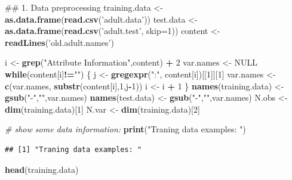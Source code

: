 \documentclass[]{article}
\newenvironment{Shaded}{\begin{snugshade}}{\end{snugshade}}
\newcommand{\KeywordTok}[1]{\textcolor[rgb]{0.13,0.29,0.53}{\textbf{#1}}}
\newcommand{\DataTypeTok}[1]{\textcolor[rgb]{0.13,0.29,0.53}{#1}}
\newcommand{\DecValTok}[1]{\textcolor[rgb]{0.00,0.00,0.81}{#1}}
\newcommand{\StringTok}[1]{\textcolor[rgb]{0.31,0.60,0.02}{#1}}
\newcommand{\CommentTok}[1]{\textcolor[rgb]{0.56,0.35,0.01}{\textit{#1}}}
\newcommand{\OtherTok}[1]{\textcolor[rgb]{0.56,0.35,0.01}{#1}}
\newcommand{\ControlFlowTok}[1]{\textcolor[rgb]{0.13,0.29,0.53}{\textbf{#1}}}
\newcommand{\OperatorTok}[1]{\textcolor[rgb]{0.81,0.36,0.00}{\textbf{#1}}}
\newcommand{\NormalTok}[1]{#1}
\begin{document}
\begin{Shaded}
\begin{Highlighting}[]
\NormalTok{## 1. Data preprocessing}
\NormalTok{training.data <-}\StringTok{ }\KeywordTok{as.data.frame}\NormalTok{(}\KeywordTok{read.csv}\NormalTok{(}\StringTok{'adult.data'}\NormalTok{))}
\NormalTok{test.data <-}\StringTok{ }\KeywordTok{as.data.frame}\NormalTok{(}\KeywordTok{read.csv}\NormalTok{(}\StringTok{'adult.test'}\NormalTok{, }\DataTypeTok{skip=}\DecValTok{1}\NormalTok{))}
\NormalTok{content <-}\StringTok{ }\KeywordTok{readLines}\NormalTok{(}\StringTok{'old.adult.names'}\NormalTok{)}

\NormalTok{i <-}\StringTok{ }\KeywordTok{grep}\NormalTok{(}\StringTok{"Attribute Information"}\NormalTok{,content) }\OperatorTok{+}\StringTok{ }\DecValTok{2}
\NormalTok{  var.names <-}\StringTok{ }\OtherTok{NULL}
  \ControlFlowTok{while}\NormalTok{(content[i]}\OperatorTok{!=}\StringTok{""}\NormalTok{) \{}
\NormalTok{    j <-}\StringTok{ }\KeywordTok{gregexpr}\NormalTok{(}\StringTok{":"}\NormalTok{, content[i])[[}\DecValTok{1}\NormalTok{]][}\DecValTok{1}\NormalTok{]}
\NormalTok{    var.names <-}\StringTok{ }\KeywordTok{c}\NormalTok{(var.names, }\KeywordTok{substr}\NormalTok{(content[i],}\DecValTok{1}\NormalTok{,j}\OperatorTok{-}\DecValTok{1}\NormalTok{))}
\NormalTok{    i <-}\StringTok{ }\NormalTok{i }\OperatorTok{+}\StringTok{ }\DecValTok{1}
\NormalTok{  \}}
  \KeywordTok{names}\NormalTok{(training.data) <-}\StringTok{ }\KeywordTok{gsub}\NormalTok{(}\StringTok{"-"}\NormalTok{,}\StringTok{""}\NormalTok{,var.names)}
  \KeywordTok{names}\NormalTok{(test.data) <-}\StringTok{ }\KeywordTok{gsub}\NormalTok{(}\StringTok{"-"}\NormalTok{,}\StringTok{""}\NormalTok{,var.names)}
\NormalTok{  N.obs <-}\StringTok{ }\KeywordTok{dim}\NormalTok{(training.data)[}\DecValTok{1}\NormalTok{]  }
\NormalTok{  N.var <-}\StringTok{ }\KeywordTok{dim}\NormalTok{(training.data)[}\DecValTok{2}\NormalTok{]}
  
  \CommentTok{# show some data information: }
  \KeywordTok{print}\NormalTok{(}\StringTok{"Traning data examples: "}\NormalTok{)}
\end{Highlighting}
\end{Shaded}

\begin{verbatim}
## [1] "Traning data examples: "
\end{verbatim}

\begin{Shaded}
\begin{Highlighting}[]
  \KeywordTok{head}\NormalTok{(training.data) }
\end{Highlighting}
\end{Shaded}
\end{document}
